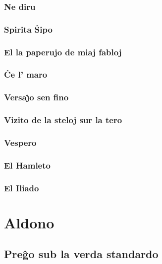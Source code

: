 \documentclass[a5paper,11pt,openany,twoside]{book}
\begin{document}
\subsection{Ne diru}
\label{nediru}


\subsection{Spirita \^Sipo}
\label{spirita}


\subsection{El la paperujo de miaj fabloj}
\label{paperujo}


\subsection{\^Ce l' maro}
\label{maro}


\subsection{Versa\^{\j}o sen fino}
\label{senfino}

\subsection{Vizito de la steloj sur la tero}
\label{vizito}


\subsection{Vespero}
\label{vespero}


\newpage %

\subsection{El Hamleto}
\label{hamleto}


\subsection{El Iliado}
\label{iliado}


%
%
\chapter{Aldono}
\section{Pre\^go sub la verda standardo}
\label{standardo}


\newpage

%
%

\end{document}
